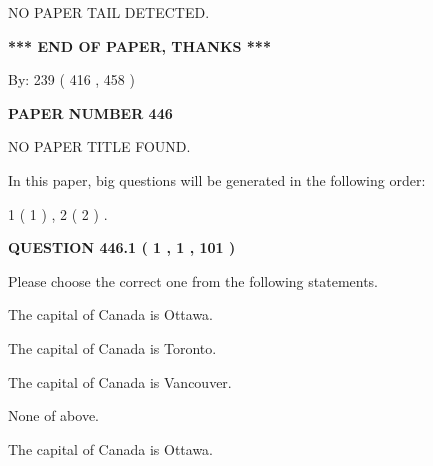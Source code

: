\documentclass[12pt]{article}
\begin{document}
   
   
   
\vspace{2.0in} NO PAPER TAIL DETECTED.
   
   
   
   
\vspace{1.0in} 
{\textbf{\large{ *** END OF PAPER, THANKS *** }}} 
   
   
\hspace{1.0in} By: 
 239 ( 416 ,  458 )
   
   
   
   
\newpage 
\setcounter{page}{ 
   446001 } 
   
   
   
   
 {\textbf{ \Large{ PAPER NUMBER  446  }}}
   
   
\vspace{0.2in}
   
   
   
   
   
   
 NO PAPER TITLE FOUND.
   
   
   
\vspace{0.2in}
   
In this paper, big questions will be generated in the following order: 
   
   
   1 ( 1 )
 ,
   2 ( 2 )
 .
  
\vspace{0.2in}
  
{\textbf{\Large{QUESTION
446.1 
 ( 1 , 1 , 101 )
}}}
  
  
Please choose the correct one from the following statements.
 
 
The capital of Canada is Ottawa.
 
 
The capital of Canada is Toronto.
 
 
The capital of Canada is Vancouver.
 
 
 None of above.
 
 
\noindent{}
 
 
The capital of Canada is Ottawa.
 
 
\noindent{}
 
\end{document}
